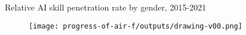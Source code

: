 {

\begin{frame}{
Relative AI skill penetration rate by gender, 2015-2021
}

\begin{figure}
 \centering
 \texttt{[image: progress-of-air-f/outputs/drawing-v00.png]}
\end{figure}

\end{frame}
}






